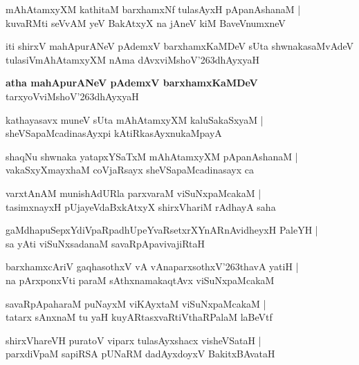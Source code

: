 \begin{shloka}
mAhAtamxyXM kathitaM barxhamxNf tulasAyxH pApanAshanaM |\\
kuvaRMti seVvAM yeV BakAtxyX na jAneV kiM BaveVnumxneV 
\end{shloka}
iti shirxV mahApurANeV pAdemxV barxhamxKaMDeV sUta shwnakasaMvAdeV tulasiVmAhAtamxyXM nAma dAvxviMshoV\char'263dhAyxyaH

\begin{center}
\textbf{\large atha mahApurANeV pAdemxV barxhamxKaMDeV}\\
tarxyoVviMshoV\char'263dhAyxyaH
\end{center}

\setcounter{shloka}{0}
\begin{shloka}
kathayasavx muneV sUta mAhAtamxyXM kaluSakaSxyaM |\\
sheVSapaMcadinasAyxpi kAtiRkasAyxnukaMpayA
\end{shloka}

\begin{shloka}
shaqNu shwnaka yatapxYSaTxM mAhAtamxyXM pApanAshanaM |\\
vakaSxyXmayxhaM coVjaRsayx sheVSapaMcadinasayx ca
\end{shloka}

\begin{shloka}
varxtAnAM munishAdURla parxvaraM viSuNxpaMcakaM |\\
tasimxnayxH pUjayeVdaBxkAtxyX shirxVhariM rAdhayA saha
\end{shloka}

\begin{shloka}
gaMdhapuSepxYdiVpaRpadhUpeYvaRsetxrXYnARnAvidheyxH PaleYH |\\
sa yAti viSuNxsadanaM savaRpApavivajiRtaH
\end{shloka}

\begin{shloka}
barxhamxcAriV gaqhasothxV vA vAnaparxsothxV\char'263thavA yatiH |\\
na pArxponxVti paraM sAthxnamakaqtAvx viSuNxpaMcakaM
\end{shloka}

\begin{shloka}
savaRpApaharaM puNayxM viKAyxtaM viSuNxpaMcakaM |\\
tatarx sAnxnaM tu yaH kuyARtasxvaRtiVthaRPalaM laBeVtf
\end{shloka}

\begin{shloka}
shirxVhareVH puratoV viparx tulasAyxshacx visheVSataH |\\
parxdiVpaM sapiRSA pUNaRM dadAyxdoyxV BakitxBAvataH
\end{shloka}

